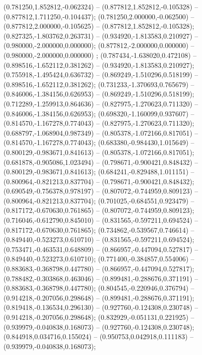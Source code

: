  (0.781250,1.852812,-0.062324) -- (0.877812,1.852812,-0.105328) -- (0.877812,1.711250,-0.104437);
 (0.781250,2.000000,-0.062500) -- (0.877812,2.000000,-0.105625) -- (0.877812,1.852812,-0.105328);
 (0.827325,-1.803762,0.263731) -- (0.934920,-1.813583,0.210927) -- (0.980000,-2.000000,0.000000);
 (0.877812,-2.000000,0.000000) -- (0.980000,-2.000000,0.000000) ;
 (0.787434,-1.638020,0.472108) -- (0.898516,-1.652112,0.381262) -- (0.934920,-1.813583,0.210927);
 (0.755918,-1.495424,0.636732) -- (0.869249,-1.510296,0.518199) -- (0.898516,-1.652112,0.381262);
 (0.731233,-1.370693,0.765679) -- (0.846006,-1.384156,0.626953) -- (0.869249,-1.510296,0.518199);
 (0.712289,-1.259913,0.864636) -- (0.827975,-1.270623,0.711320) -- (0.846006,-1.384156,0.626953);
 (0.698320,-1.160099,0.937607) -- (0.814570,-1.167278,0.774043) -- (0.827975,-1.270623,0.711320);
 (0.688797,-1.068904,0.987349) -- (0.805378,-1.072166,0.817051) -- (0.814570,-1.167278,0.774043);
 (0.683380,-0.984430,1.015649) -- (0.800129,-0.983671,0.841613) -- (0.805378,-1.072166,0.817051);
 (0.681878,-0.905086,1.023494) -- (0.798671,-0.900421,0.848432) -- (0.800129,-0.983671,0.841613);
 (0.684241,-0.829488,1.011151) -- (0.800964,-0.821213,0.837704) -- (0.798671,-0.900421,0.848432);
 (0.690549,-0.756378,0.978197) -- (0.807072,-0.744959,0.809123) -- (0.800964,-0.821213,0.837704);
 (0.701025,-0.684551,0.923479) -- (0.817172,-0.670630,0.761865) -- (0.807072,-0.744959,0.809123);
 (0.716046,-0.612790,0.845010) -- (0.831565,-0.597211,0.694524) -- (0.817172,-0.670630,0.761865);
 (0.734862,-0.539567,0.746614) -- (0.849440,-0.523273,0.610710) -- (0.831565,-0.597211,0.694524);
 (0.753471,-0.463531,0.648809) -- (0.866957,-0.447094,0.527817) -- (0.849440,-0.523273,0.610710);
 (0.771400,-0.384857,0.554006) -- (0.883683,-0.368798,0.447780) -- (0.866957,-0.447094,0.527817);
 (0.788482,-0.303868,0.463046) -- (0.899481,-0.288676,0.371191) -- (0.883683,-0.368798,0.447780);
 (0.804545,-0.220946,0.376794) -- (0.914218,-0.207056,0.298648) -- (0.899481,-0.288676,0.371191);
 (0.819418,-0.136534,0.296130) -- (0.927760,-0.124308,0.230748) -- (0.914218,-0.207056,0.298648);
 (0.832929,-0.051131,0.221925) -- (0.939979,-0.040838,0.168073) -- (0.927760,-0.124308,0.230748);
 (0.844918,0.034716,0.155024) -- (0.950753,0.042918,0.111183) -- (0.939979,-0.040838,0.168073);
